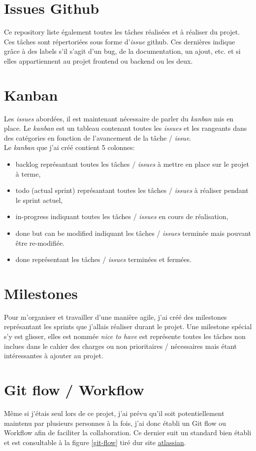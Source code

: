 \documentclass[
    iai, %
    il, %
]{heig-tb}
\begin{document}
\section{Issues Github}
Ce \Gls{repository} liste également toutes les tâches réalisées et à réaliser du projet. Ces tâches sont répertoriées sous forme d'\emph{issue} \Gls{github}. Ces dernières indique grâce à des labels s'il s'agit d'un bug, de la documentation, un ajout, etc. et si elles appartiennent au projet \Gls {frontend} ou \Gls{backend} ou les deux.

\section{Kanban}
Les \emph{issues} abordées, il est maintenant nécessaire de parler du \emph{kanban} mis en place. Le \emph{kanban} est un tableau contenant toutes les \emph{issues} et les rangeants dans des catégories en fonction de l'avancement de la tâche / \emph{issue}. \\
Le \emph{kanban} que j'ai créé contient 5 colonnes:
\begin{itemize}
    \item backlog représantant toutes les tâches / \emph{issues} à mettre en place sur le projet à terme,
    \item todo (actual sprint) représantant toutes les tâches / \emph{issues} à réaliser pendant le sprint actuel,
    \item in-progress indiquant toutes les tâches / \emph{issues} en cours de réalisation,
    \item done but can be modified indiquant les tâches / \emph{issues} terminée mais pouvant être re-modifiée.
    \item done représentant les tâches / \emph{issues} terminées et fermées.
\end{itemize}

\section{Milestones}
Pour m'organiser et travailler d'une manière agile, j'ai créé des milestones représantant les sprints que j'allais réaliser durant le projet. Une milestone spécial s'y est glisser, elles est nommée \emph{nice to have} est représente toutes les tâches non inclues dans le cahier des charges ou non prioritaires / nécessaires mais étant intéressantes à ajouter au projet.

\section{Git flow / Workflow}
Même si j'étais seul lors de ce projet, j'ai prévu qu'il soit potentiellement maintenu par plusieurs personnes à la fois, j'ai donc établi un Git flow ou Workflow afin de faciliter la collaboration. Ce dernier suit un standard bien établi et est consultable à la figure
\ref{git-flow} tiré dur site \href{https://www.atlassian.com/fr/git/tutorials/comparing-workflows/.gitflow-workflow}{atlassian}.
\end{document}
